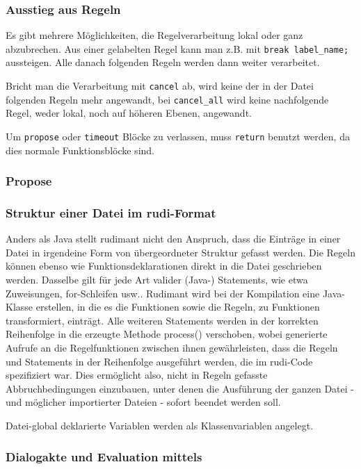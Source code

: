 \subsubsection{Ausstieg aus Regeln}

Es gibt mehrere Möglichkeiten, die Regelverarbeitung lokal oder ganz
abzubrechen. Aus einer gelabelten Regel kann man z.B. mit
\verb|break label_name;| aussteigen. Alle danach folgenden Regeln werden dann
weiter verarbeitet.

Bricht man die Verarbeitung mit \texttt{cancel} ab, wird keine der in
der Datei folgenden Regeln mehr angewandt, bei \texttt{cancel\_all} wird
keine nachfolgende Regel, weder lokal, noch auf höheren Ebenen, angewandt.

Um \texttt{propose} oder \texttt{timeout} Blöcke zu verlassen, muss
\texttt{return} benutzt werden, da dies normale Funktionsblöcke sind.

\subsubsection{Propose}

\subsubsection{Struktur einer Datei im rudi-Format}

Anders als Java stellt rudimant nicht den Anspruch, dass die Einträge in einer
Datei in irgendeine Form von übergeordneter Struktur gefasst werden. Die Regeln
können ebenso wie Funktionsdeklarationen direkt in die Datei geschrieben
werden. Dasselbe gilt für jede Art valider (Java-) Statements, wie etwa
Zuweisungen, for-Schleifen usw.. Rudimant wird bei der Kompilation eine
Java-Klasse erstellen, in die es die Funktionen sowie die Regeln, zu Funktionen
transformiert, einträgt. Alle weiteren Statements werden in der korrekten
Reihenfolge in die erzeugte Methode process() verschoben, wobei generierte
Aufrufe an die Regelfunktionen zwischen ihnen gewährleisten, dass die Regeln
und Statements in der Reihenfolge ausgeführt werden, die im rudi-Code
spezifiziert war. Dies ermöglicht also, nicht in Regeln gefasste
Abbruchbedingungen einzubauen, unter denen die Ausführung der ganzen Datei -
und möglicher importierter Dateien - sofort beendet werden soll.

Datei-global deklarierte Variablen werden als Klassenvariablen angelegt.

\subsubsection{Dialogakte und Evaluation mittels \caret}
\label{sub:caret}

